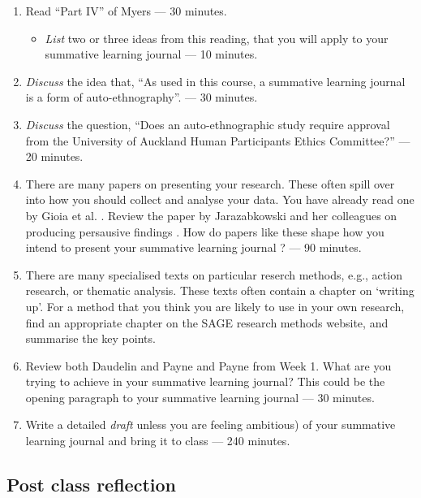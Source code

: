\documentclass[]{book}
\providecommand{\tightlist}{%
  \setlength{\itemsep}{0pt}\setlength{\parskip}{0pt}}
\theoremstyle{definition}
\theoremstyle{definition}
\theoremstyle{definition}
\theoremstyle{remark}
\begin{document}
\begin{enumerate}
\def\labelenumi{\arabic{enumi}.}
\item
  Read ``Part IV'' of Myers \autocite*[
  p.~221--250]{myers_2013_qualitativeresearchbusiness} --- 30 minutes.

  \begin{itemize}
  \tightlist
  \item
    \emph{List} two or three ideas from this reading, that you will
    apply to your summative learning journal --- 10 minutes.
  \end{itemize}
\item
  \emph{Discuss} the idea that, ``As used in this course, a summative
  learning journal is a form of auto-ethnography''. --- 30 minutes.
\item
  \emph{Discuss} the question, ``Does an auto-ethnographic study require
  approval from the University of Auckland Human Participants Ethics
  Committee?'' --- 20 minutes.
\item
  There are many papers on presenting your research. These often spill
  over into how you should collect and analyse your data. You have
  already read one by Gioia et al.
  \autocite*{gioia_2013_seekingqualitativerigor}. Review the paper by
  Jarazabkowski and her colleagues on producing persausive findings
  \autocite{jarzabkowski_2014_producingpersuasivefindings}. How do
  papers like these shape how you intend to present your summative
  learning journal ? --- 90 minutes.
\item
  There are many specialised texts on particular reserch methods, e.g.,
  action research, or thematic analysis. These texts often contain a
  chapter on `writing up'. For a method that you think you are likely to
  use in your own research, find an appropriate chapter on the SAGE
  research methods website, and summarise the key points.
\item
  Review both Daudelin
  \autocite*{daudelin_1996_learningexperiencereflection}and Payne and
  Payne \autocite*{payne_2004_reflexivity} from Week 1. What are you
  trying to achieve in your summative learning journal? This could be
  the opening paragraph to your summative learning journal --- 30
  minutes.
\item
  Write a detailed \emph{draft} unless you are feeling ambitious) of
  your summative learning journal and bring it to class --- 240 minutes.
\end{enumerate}

\hypertarget{post-class-reflection-10}{%
\subsection{Post class reflection}\label{post-class-reflection-10}}
\end{document}
